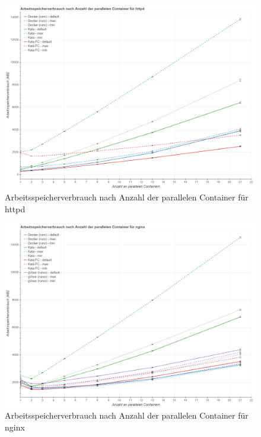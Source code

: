 \begin{figure}[h]
	\centering
	\includegraphics[width=0.96\linewidth]{gfx/auswertung/ram_httpd.png}
	\caption{Arbeitsspeicherverbrauch nach Anzahl der parallelen Container für httpd} 
	\label{fig:ram_httpd}
\end{figure}
\newpage
\begin{figure}[h]
	\centering
	\includegraphics[width=0.96\linewidth]{gfx/auswertung/ram_nginx.png}
	\caption{Arbeitsspeicherverbrauch nach Anzahl der parallelen Container für nginx} 
	\label{fig:ram_nginx}
\end{figure}
\newpage
